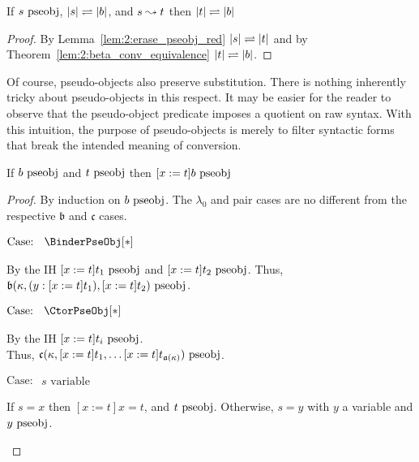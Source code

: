 \begin{lemma}
    \label{lem:2:pseobj_red_f_step}
    If $s~\textnormal{pseobj}$, $|s| \rightleftharpoons |b|$, and $s \leadsto t$ then $|t| \rightleftharpoons |b|$
\end{lemma}
\begin{proof}
    By Lemma~\ref{lem:2:erase_pseobj_red} $|s| \rightleftharpoons |t|$ and by Theorem~\ref{lem:2:beta_conv_equivalence} $|t| \rightleftharpoons |b|$.
\end{proof}

Of course, pseudo-objects also preserve substitution.
There is nothing inherently tricky about pseudo-objects in this respect.
It may be easier for the reader to observe that the pseudo-object predicate imposes a quotient on raw syntax.
With this intuition, the purpose of pseudo-objects is merely to filter syntactic forms that break the intended meaning of conversion.

\begin{lemma}
    \label{lem:2:pseobj_subst}
    If $b~\textnormal{pseobj}$ and $t~\textnormal{pseobj}$ then $[x := t]b~\textnormal{pseobj}$
\end{lemma}
\begin{proof}
    By induction on $b~\textnormal{pseobj}$. The $\lambda_0$ and pair cases are no different from the respective $\mathfrak{b}$ and $\mathfrak{c}$ cases.

    $\text{Case: }\begin{array}{c} \BinderPseObj[*] \end{array}$
    \begin{proofcase}
        By the IH $[x := t]t_1~\textnormal{pseobj}$ and $[x := t]t_2~\textnormal{pseobj}$.
        Thus, $\mathfrak{b}(\kappa, (y : [x := t]t_1), [x := t]t_2)~\textnormal{pseobj}$.
    \end{proofcase}

    $\text{Case: }\begin{array}{c} \CtorPseObj[*] \end{array}$
    \begin{proofcase}
        By the IH $[x := t]t_i~\textnormal{pseobj}$. \\
        Thus, $\mathfrak{c}(\kappa, [x := t]t_1, \ldots [x := t]t_{\mathfrak{a}(\kappa)})~\textnormal{pseobj}$.
    \end{proofcase}

    $\text{Case: }\begin{array}{c} s\text{ variable} \end{array}$
    \begin{proofcase}
        If $s = x$ then $[x := t]x = t$, and $t~\textnormal{pseobj}$.
        Otherwise, $s = y$ with $y$ a variable and $y~\textnormal{pseobj}$.
    \end{proofcase}
\end{proof}

